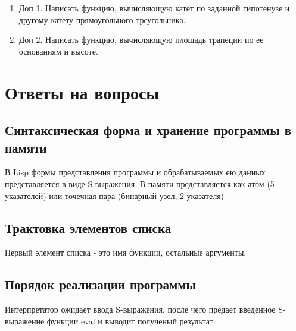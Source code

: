 \begin{enumerate}
	\item Доп 1. Написать функцию, вычисляющую катет по заданной гипотенузе и другому катету прямоугольного треугольника.
	\item Доп 2. Написать функцию, вычисляющую площадь трапеции по ее основаниям и высоте.
\end{enumerate}

\begin{figure}[ht!]
\end{figure}


\chapter{Ответы на вопросы}

\section{Синтаксическая форма и хранение программы в памяти}

В Lisp формы представления программы и обрабатываемых ею данных 
представляется в виде S-выражения. В памяти представляется как атом 
(5 указателей) или точечная пара (бинарный узел, 2 указателя)

\section{Трактовка элементов списка}

Первый элемент списка - это имя функции, остальные аргументы.

\section{Порядок реализации программы}

Интерпретатор ожидает ввода S-выражения, после чего предает 
введенное S-выражение функции eval и выводит полученый результат.

